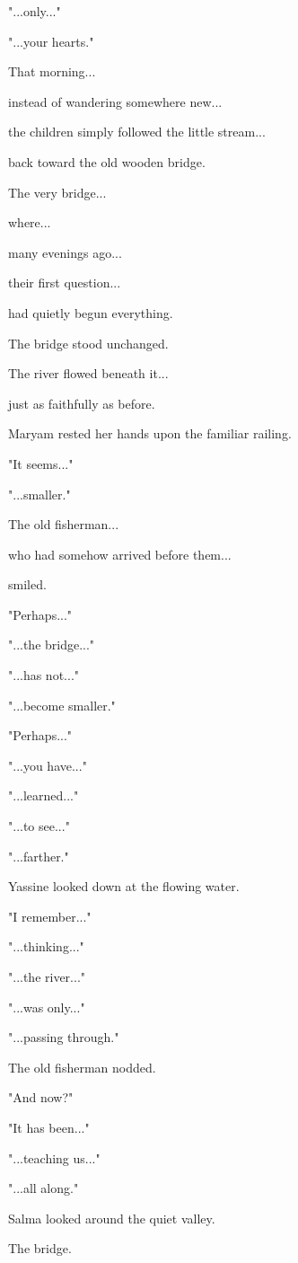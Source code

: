 \documentclass[12pt,openany]{book}
\begin{document}
"...only..."

"...your hearts."

That morning...

instead of wandering somewhere new...

the children simply followed the little stream...

back toward the old wooden bridge.

The very bridge...

where...

many evenings ago...

their first question...

had quietly begun everything.

The bridge stood unchanged.

The river flowed beneath it...

just as faithfully as before.

Maryam rested her hands upon the familiar railing.

"It seems..."

"...smaller."

The old fisherman...

who had somehow arrived before them...

smiled.

"Perhaps..."

"...the bridge..."

"...has not..."

"...become smaller."

"Perhaps..."

"...you have..."

"...learned..."

"...to see..."

"...farther."

Yassine looked down at the flowing water.

"I remember..."

"...thinking..."

"...the river..."

"...was only..."

"...passing through."

The old fisherman nodded.

"And now?"

"It has been..."

"...teaching us..."

"...all along."

Salma looked around the quiet valley.

The bridge.
\end{document}
